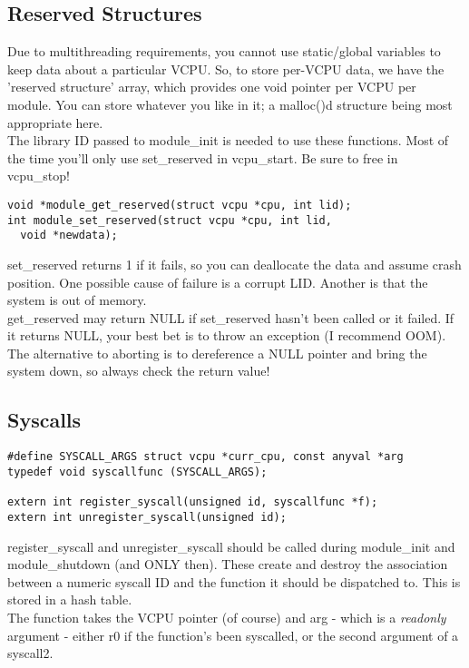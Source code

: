 \documentclass[a4paper,oneside,openany]{book}
\begin{document}
\subsection{Reserved Structures}
Due to multithreading requirements, you cannot use static/global variables to keep
data about a particular VCPU. So, to store per-VCPU data, we have the 'reserved
structure' array, which provides one void pointer per VCPU per module. You can
store whatever you like in it; a malloc()d structure being most appropriate here.
\smallskip\\
The library ID passed to module\_init is needed to use these functions. Most of
the time you'll only use set\_reserved in vcpu\_start. Be sure to free in
vcpu\_stop!
\begin{verbatim}
void *module_get_reserved(struct vcpu *cpu, int lid);
int module_set_reserved(struct vcpu *cpu, int lid,
  void *newdata);
\end{verbatim}
set\_reserved returns 1 if it fails, so you can deallocate the data and assume
crash position. One possible cause of failure is a corrupt LID. Another is
that the system is out of memory.\smallskip\\
get\_reserved may return NULL if set\_reserved hasn't been called or it failed.
If it returns NULL, your best bet is to throw an exception (I recommend OOM).
The alternative to aborting is to dereference a NULL pointer and bring the
system down, so always check the return value!
\subsection{Syscalls}
\begin{verbatim}
#define SYSCALL_ARGS struct vcpu *curr_cpu, const anyval *arg
typedef void syscallfunc (SYSCALL_ARGS);

extern int register_syscall(unsigned id, syscallfunc *f);
extern int unregister_syscall(unsigned id);
\end{verbatim}
register\_syscall and unregister\_syscall should be called during module\_init
and module\_shutdown (and ONLY then). These create and destroy the association
between a numeric syscall ID and the function it should be dispatched to.
This is stored in a hash table.
\smallskip\\
The function takes the VCPU pointer (of course) and arg - which is a \emph{readonly}
argument - either r0 if the function's been syscalled, or the second argument
of a syscall2.
\end{document}
